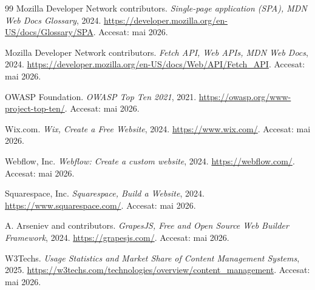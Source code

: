 \documentclass[12pt,a4paper]{report}
\begin{document}
\begin{thebibliography}{99}
Mozilla Developer Network contributors.
\textit{Single-page application (SPA), MDN Web Docs Glossary}, 2024.
\url{https://developer.mozilla.org/en-US/docs/Glossary/SPA}.
Accesat: mai 2026.

Mozilla Developer Network contributors.
\textit{Fetch API, Web APIs, MDN Web Docs}, 2024.
\url{https://developer.mozilla.org/en-US/docs/Web/API/Fetch_API}.
Accesat: mai 2026.

OWASP Foundation.
\textit{OWASP Top Ten 2021}, 2021.
\url{https://owasp.org/www-project-top-ten/}.
Accesat: mai 2026.

Wix.com.
\textit{Wix, Create a Free Website}, 2024.
\url{https://www.wix.com/}.
Accesat: mai 2026.

Webflow, Inc.
\textit{Webflow: Create a custom website}, 2024.
\url{https://webflow.com/}.
Accesat: mai 2026.

Squarespace, Inc.
\textit{Squarespace, Build a Website}, 2024.
\url{https://www.squarespace.com/}.
Accesat: mai 2026.

A. Arseniev and contributors.
\textit{GrapesJS, Free and Open Source Web Builder Framework}, 2024.
\url{https://grapesjs.com/}.
Accesat: mai 2026.

W3Techs.
\textit{Usage Statistics and Market Share of Content Management Systems}, 2025.
\url{https://w3techs.com/technologies/overview/content_management}.
Accesat: mai 2026.

\end{thebibliography}
\end{document}
